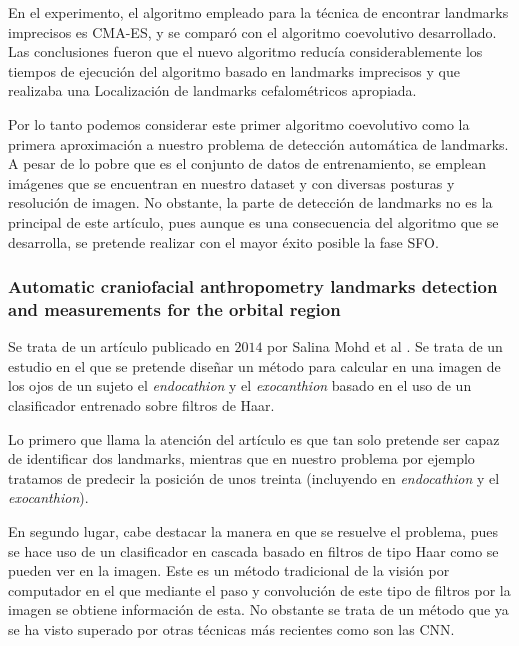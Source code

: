                 \noindent En el experimento, el algoritmo empleado para la técnica de encontrar landmarks imprecisos es CMA-ES, y se comparó con el algoritmo coevolutivo desarrollado. Las conclusiones fueron que el nuevo algoritmo reducía considerablemente los tiempos de ejecución del algoritmo basado en landmarks imprecisos y que realizaba una Localización de landmarks cefalométricos apropiada. 
                
                \medskip

                \noindent Por lo tanto podemos considerar este primer algoritmo coevolutivo como la primera aproximación a nuestro problema de detección automática de landmarks. A pesar de lo pobre que es el conjunto de datos de entrenamiento, se emplean imágenes que se encuentran en nuestro dataset y con diversas posturas y resolución de imagen. No obstante, la parte de detección de landmarks no es la principal de este artículo, pues aunque es una consecuencia del algoritmo que se desarrolla, se pretende realizar con el mayor éxito posible la fase SFO.

            \subsubsection{Automatic craniofacial anthropometry landmarks detection and measurements for the orbital region}
                \noindent Se trata de un artículo publicado en $2014$ por Salina Mohd et al \cite{asi2014automatic}. Se trata de un estudio en el que se pretende diseñar un método para calcular en una imagen de los ojos de un sujeto el \textit{endocathion} y el \textit{exocanthion} basado en el uso de un clasificador entrenado sobre filtros de Haar.

                \medskip

                \noindent Lo primero que llama la atención del artículo es que tan solo pretende ser capaz de identificar dos landmarks, mientras que en nuestro problema por ejemplo tratamos de predecir la posición de unos treinta (incluyendo en \textit{endocathion} y el \textit{exocanthion}).

                \medskip

                \noindent En segundo lugar, cabe destacar la manera en que se resuelve el problema, pues se hace uso de un clasificador en cascada basado en filtros de tipo Haar como se pueden ver en la imagen. Este es un método tradicional de la visión por computador en el que mediante el paso y convolución de este tipo de filtros por la imagen se obtiene información de esta. No obstante se trata de un método que ya se ha visto superado por otras técnicas más recientes como son las CNN.

